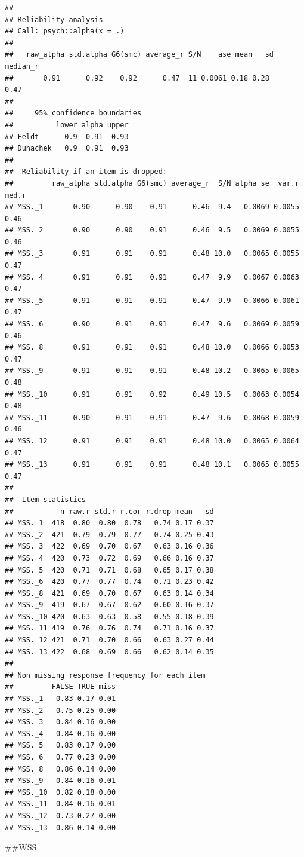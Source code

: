 \documentclass[
]{article}
\begin{document}
\begin{verbatim}
## 
## Reliability analysis   
## Call: psych::alpha(x = .)
## 
##   raw_alpha std.alpha G6(smc) average_r S/N    ase mean   sd median_r
##       0.91      0.92    0.92      0.47  11 0.0061 0.18 0.28     0.47
## 
##     95% confidence boundaries 
##          lower alpha upper
## Feldt      0.9  0.91  0.93
## Duhachek   0.9  0.91  0.93
## 
##  Reliability if an item is dropped:
##         raw_alpha std.alpha G6(smc) average_r  S/N alpha se  var.r med.r
## MSS._1       0.90      0.90    0.91      0.46  9.4   0.0069 0.0055  0.46
## MSS._2       0.90      0.90    0.91      0.46  9.5   0.0069 0.0055  0.46
## MSS._3       0.91      0.91    0.91      0.48 10.0   0.0065 0.0055  0.47
## MSS._4       0.91      0.91    0.91      0.47  9.9   0.0067 0.0063  0.47
## MSS._5       0.91      0.91    0.91      0.47  9.9   0.0066 0.0061  0.47
## MSS._6       0.90      0.91    0.91      0.47  9.6   0.0069 0.0059  0.46
## MSS._8       0.91      0.91    0.91      0.48 10.0   0.0066 0.0053  0.47
## MSS._9       0.91      0.91    0.91      0.48 10.2   0.0065 0.0065  0.48
## MSS._10      0.91      0.91    0.92      0.49 10.5   0.0063 0.0054  0.48
## MSS._11      0.90      0.91    0.91      0.47  9.6   0.0068 0.0059  0.46
## MSS._12      0.91      0.91    0.91      0.48 10.0   0.0065 0.0064  0.47
## MSS._13      0.91      0.91    0.91      0.48 10.1   0.0065 0.0055  0.47
## 
##  Item statistics 
##           n raw.r std.r r.cor r.drop mean   sd
## MSS._1  418  0.80  0.80  0.78   0.74 0.17 0.37
## MSS._2  421  0.79  0.79  0.77   0.74 0.25 0.43
## MSS._3  422  0.69  0.70  0.67   0.63 0.16 0.36
## MSS._4  420  0.73  0.72  0.69   0.66 0.16 0.37
## MSS._5  420  0.71  0.71  0.68   0.65 0.17 0.38
## MSS._6  420  0.77  0.77  0.74   0.71 0.23 0.42
## MSS._8  421  0.69  0.70  0.67   0.63 0.14 0.34
## MSS._9  419  0.67  0.67  0.62   0.60 0.16 0.37
## MSS._10 420  0.63  0.63  0.58   0.55 0.18 0.39
## MSS._11 419  0.76  0.76  0.74   0.71 0.16 0.37
## MSS._12 421  0.71  0.70  0.66   0.63 0.27 0.44
## MSS._13 422  0.68  0.69  0.66   0.62 0.14 0.35
## 
## Non missing response frequency for each item
##         FALSE TRUE miss
## MSS._1   0.83 0.17 0.01
## MSS._2   0.75 0.25 0.00
## MSS._3   0.84 0.16 0.00
## MSS._4   0.84 0.16 0.00
## MSS._5   0.83 0.17 0.00
## MSS._6   0.77 0.23 0.00
## MSS._8   0.86 0.14 0.00
## MSS._9   0.84 0.16 0.01
## MSS._10  0.82 0.18 0.00
## MSS._11  0.84 0.16 0.01
## MSS._12  0.73 0.27 0.00
## MSS._13  0.86 0.14 0.00
\end{verbatim}

\#\#WSS
\end{document}
